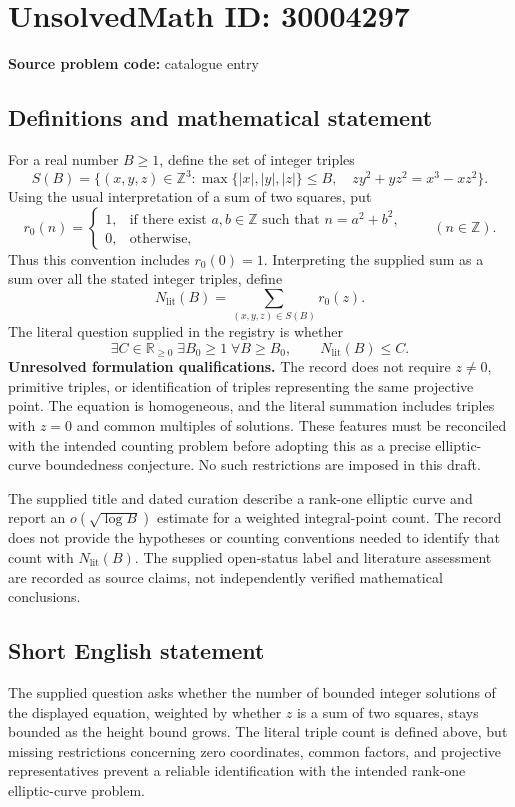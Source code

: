 \documentclass[11pt]{article}
\newcommand{\Z}{\mathbb{Z}}
\newcommand{\R}{\mathbb{R}}
\begin{document}
\section*{UnsolvedMath ID: 30004297}
\textbf{Source problem code:} catalogue entry
\subsection{Definitions and mathematical statement}
For a real number \(B\geq 1\), define the set of integer triples
\[
S(B)=\{(x,y,z)\in\Z^3: \max\{|x|,|y|,|z|\}\leq B,\quad zy^2+yz^2=x^3-xz^2\}.
\]
Using the usual interpretation of a sum of two squares, put
\[
r_0(n)=\begin{cases}
1,&\text{if there exist }a,b\in\Z\text{ such that }n=a^2+b^2,\\
0,&\text{otherwise},
\end{cases}
\qquad(n\in\Z).
\]
Thus this convention includes \(r_0(0)=1\). Interpreting the supplied sum as a sum over all the stated integer triples, define
\[
N_{\mathrm{lit}}(B)=\sum_{(x,y,z)\in S(B)}r_0(z).
\]
The literal question supplied in the registry is whether
\[
\exists C\in\R_{\geq0}\;\exists B_0\geq1\;\forall B\geq B_0,
\qquad N_{\mathrm{lit}}(B)\leq C.
\]
\textbf{Unresolved formulation qualifications.} The record does not require \(z\neq0\), primitive triples, or identification of triples representing the same projective point. The equation is homogeneous, and the literal summation includes triples with \(z=0\) and common multiples of solutions. These features must be reconciled with the intended counting problem before adopting this as a precise elliptic-curve boundedness conjecture. No such restrictions are imposed in this draft.

The supplied title and dated curation describe a rank-one elliptic curve and report an \(o(\sqrt{\log B})\) estimate for a weighted integral-point count. The record does not provide the hypotheses or counting conventions needed to identify that count with \(N_{\mathrm{lit}}(B)\). The supplied open-status label and literature assessment are recorded as source claims, not independently verified mathematical conclusions.
\subsection{Short English statement}
The supplied question asks whether the number of bounded integer solutions of the displayed equation, weighted by whether \(z\) is a sum of two squares, stays bounded as the height bound grows. The literal triple count is defined above, but missing restrictions concerning zero coordinates, common factors, and projective representatives prevent a reliable identification with the intended rank-one elliptic-curve problem.
\end{document}
